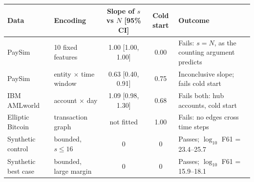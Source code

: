 \documentclass[10pt]{article}
\newenvironment{sectionblock}
{%
    \par
    \vspace{2pt}
    \noindent
    \begin{minipage}{\textwidth}
}
{%
    \end{minipage}
    \par
    \vspace{5pt}
}
\begin{document}
\begin{sectionblock}
\vspace{2pt}
\begin{center}
\small
\begin{tabularx}{\textwidth}{@{}llCCY@{}}
\toprule
\textbf{Data} & \textbf{Encoding} & \textbf{Slope of $s$ vs $N$ [95\% CI]} & \textbf{Cold start} & \textbf{Outcome} \\
\midrule
PaySim & 10 fixed features & 1.00 [1.00, 1.00] & 0.00 & Fails: $s=N$, as the counting argument predicts \\
PaySim & entity $\times$ time window & 0.63 [0.40, 0.91] & 0.75 & Inconclusive slope; fails cold start \\
IBM AMLworld & account $\times$ day & 1.09 [0.98, 1.30] & 0.68 & Fails both: hub accounts, cold start \\
Elliptic Bitcoin & transaction graph & not fitted & 1.00 & Fails: no edges cross time steps \\
\midrule
Synthetic control & bounded, $s\le16$ & 0 & 0 & Passes; $\log_{10}$ F61 = 23.4--25.7 \\
Synthetic best case & bounded, large margin & 0 & 0 & Passes; $\log_{10}$ F61 = 15.9--18.1 \\
\bottomrule
\end{tabularx}
\end{center}

\end{sectionblock}
\end{document}

